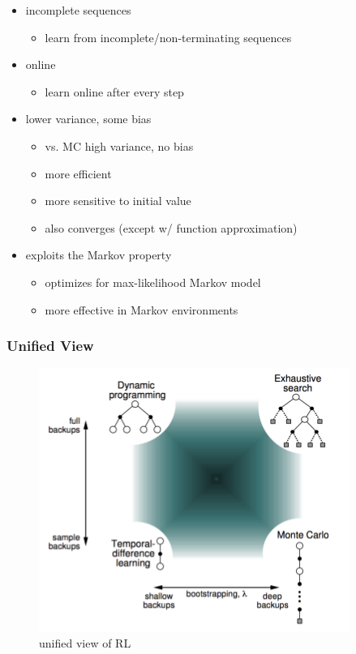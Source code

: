 \documentclass[]{article}
\theoremstyle{definition}
\begin{document}
\begin{itemize}
    \item incomplete sequences
        \begin{itemize}
            \item learn from incomplete/non-terminating sequences
        \end{itemize}
    \item online
        \begin{itemize}
            \item learn online after every step
        \end{itemize}
    \item lower variance, some bias
        \begin{itemize}
            \item vs. MC high variance, no bias
            \item more efficient
            \item more sensitive to initial value
            \item also converges (except w/ function approximation)
        \end{itemize}
    \item exploits the Markov property
        \begin{itemize}
            \item optimizes for max-likelihood Markov model
            \item more effective in Markov environments
        \end{itemize}
\end{itemize}

\subsubsection{Unified View}%
\label{ssub:unified_view}

\begin{figure}[ht]
    \centering
    \includegraphics[width=0.5\linewidth]{unified-view.png}
    \caption{unified view of RL}
    \label{fig:unified-view}
\end{figure}
\end{document}
